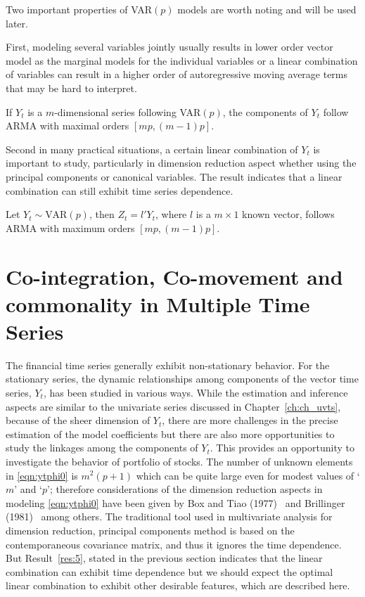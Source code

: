 Two important properties of VAR$(p)$ models are worth noting and will be used later. 


First, modeling several variables jointly usually results in lower order vector model as the marginal models for the individual variables or a linear combination of variables can result in a higher order of autoregressive moving average terms that may be hard to interpret.


\begin{result} \label{res:5} 
If $Y_t$ is a $m$-dimensional series following VAR$(p)$, the components of $Y_t$ follow ARMA with maximal orders $[mp,(m-1)p]$. 


Second in many practical situations, a certain linear combination of $Y_t$ is important to study, particularly in dimension reduction aspect whether using the principal components or canonical variables. The result indicates that a linear combination can still exhibit time series dependence. 
\end{result}


\begin{result} \label{res:6} 
Let $Y_t \sim \text{VAR}(p)$, then $Z_t= l' Y_t$, where $l$ is a $m \times 1$ known vector, follows ARMA with maximum orders $[mp, (m-1)p]$. 
\end{result}



\section{Co-integration, Co-movement and commonality in Multiple Time Series \label{sec:comts}}


The financial time series generally exhibit non-stationary behavior. For the stationary series, the dynamic relationships among components of the vector time series, $Y_t$, has been studied in various ways. While the estimation and inference aspects are similar to the univariate series discussed in Chapter~\ref{ch:ch_uvts}, because of the sheer dimension of $Y_t$, there are more challenges in the precise estimation of the model coefficients but there are also more opportunities to study the linkages among the components of $Y_t$. This provides an opportunity to investigate the behavior of portfolio of stocks. The number of unknown elements in \eqref{eqn:ytphi0} is $m^2 (p+1)$ which can be quite large even for modest values of `$m$' and `$p$'; therefore considerations of the dimension reduction aspects in modeling \eqref{eqn:ytphi0} have been given by Box and Tiao (1977)~\cite{box77} and Brillinger (1981)~\cite{brill81} among others. The traditional tool used in multivariate analysis for dimension reduction, principal components method is based on the contemporaneous covariance matrix, and thus it ignores the time dependence. But Result~\ref{res:5}, stated in the previous section indicates that the linear combination can exhibit time dependence but we should expect the optimal linear combination to exhibit other desirable features, which are described here. 


